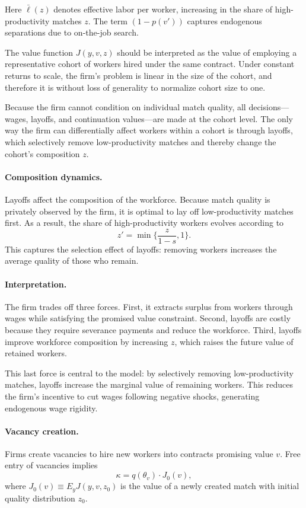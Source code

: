 Here $\bar{\ell}(z)$ denotes effective labor per worker, increasing in the share of high-productivity matches $z$. The term $(1-p(v'))$ captures endogenous separations due to on-the-job search.

The value function $J(y,v,z)$ should be interpreted as the value of employing a representative cohort of workers hired under the same contract. Under constant returns to scale, the firm’s problem is linear in the size of the cohort, and therefore it is without loss of generality to normalize cohort size to one.

Because the firm cannot condition on individual match quality, all decisions—wages, layoffs, and continuation values—are made at the cohort level. The only way the firm can differentially affect workers within a cohort is through layoffs, which selectively remove low-productivity matches and thereby change the cohort’s composition $z$.


\paragraph{Composition dynamics.}
Layoffs affect the composition of the workforce. Because match quality is privately observed by the firm, it is optimal to lay off low-productivity matches first. As a result, the share of high-productivity workers evolves according to
\[
z' = \min\{\frac{z}{1-s},1\}.
\]
This captures the selection effect of layoffs: removing workers increases the average quality of those who remain.

\paragraph{Interpretation.}
The firm trades off three forces. First, it extracts surplus from workers through wages while satisfying the promised value constraint. Second, layoffs are costly because they require severance payments and reduce the workforce. Third, layoffs improve workforce composition by increasing $z$, which raises the future value of retained workers.

This last force is central to the model: by selectively removing low-productivity matches, layoffs increase the marginal value of remaining workers. This reduces the firm’s incentive to cut wages following negative shocks, generating endogenous wage rigidity.

\paragraph{Vacancy creation.}
Firms create vacancies to hire new workers into contracts promising value $v$. Free entry of vacancies implies
\[
\kappa = q(\theta_v) \cdot J_0(v),
\]
where $J_0(v) \equiv E_y J(y,v,z_0)$ is the value of a newly created match with initial quality distribution $z_0$.

